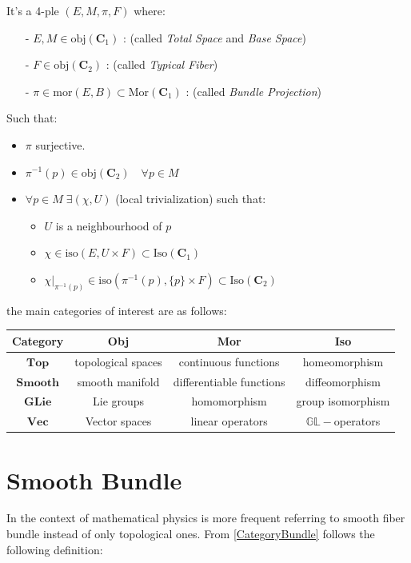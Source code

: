 \documentclass[a4paper,12pt]{scrartcl}    %
\begin{document}
\begin{definition}\label{CategoryBundle}
It's a 4-ple $(E,M,\pi,F)$ where:
\begin{itemize}
\item[-] $E, M \in \textrm{obj}(\mathbf{C}_{1})$ : (called \emph{Total Space} and \emph{Base Space})
\item[-] $F \in \textrm{obj}(\mathbf{C}_{2})$ : (called \emph{Typical Fiber})
\item[-] $\pi \in \textrm{mor}(E,B) \subset \textrm{Mor}(\mathbf{C}_{1})$ : (called \emph{Bundle Projection})
\end{itemize}
Such that:
\begin{itemize}
\item $\pi$ surjective.
\item $\pi^{-1} (p) \in \textrm{obj}(\mathbf{C}_{2}) \quad \forall p \in M $
\item $\forall p \in M \; \exists (\chi,U)$ (local trivialization) such that:
	\begin{itemize}
	\item $U$ is a neighbourhood of $p$
	\item $\chi \in \textrm{iso}(E,U\times F)\subset \textrm{Iso}(\mathbf{C}_{1})$
	\item $\chi \vert_{\pi^{-1}(p)} \in \textrm{iso}(\pi^{-1}(p),\{p\}\times F)\subset \textrm{Iso}(\mathbf{C}_{2}) $
	\end{itemize}
\end{itemize}
\end{definition}
the main categories of interest are as follows:

\begin{tabular}{|c|c|c|c|}
\hline 
Category & Obj & Mor & Iso \\ 
\hline 
$\mathbf{Top}$ & topological spaces & continuous functions & homeomorphism \\ 
$\mathbf{Smooth}$ & smooth manifold & differentiable functions & diffeomorphism \\ 
$\mathbf{GLie}$ & Lie groups & homomorphism & group isomorphism \\ 
$\mathbf{Vec}$ & Vector spaces & linear operators & $\mathbb{GL}-$operators \\ 
\hline 
\end{tabular} 


\newpage
\section{Smooth Bundle}
In the context of mathematical physics is more frequent referring to smooth fiber bundle instead of only topological ones.
From \ref{CategoryBundle} follows the following definition:
\end{document}
